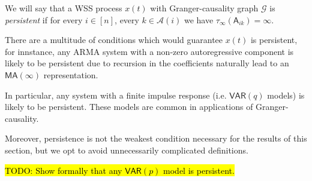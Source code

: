 \documentclass[12pt]{article}
\def\gcg{\mathcal{G}}  %
\def\VAR{\mathsf{VAR}}  %
\def\A{\mathsf{A}}  %
\newcommand{\anc}[1]{\mathcal{A}(#1)}  %
\begin{document}
\begin{definition}[Persistent]
  We will say that a WSS process $x(t)$ with Granger-causality graph
  $\gcg$ is \textit{persistent} if for every $i \in [n]$, every
  $k \in \anc{i}$ we have $\tau_\infty(\A_{ik}) = \infty$.
\end{definition}

\begin{remark}
  There are a multitude of conditions which would guarantee $x(t)$ is
  persistent, for innstance, any ARMA system with a non-zero
  autoregressive component is likely to be persistent due to recursion
  in the coefficients naturally lead to an $\mathsf{MA}(\infty)$
  representation.

  In particular, any system with a finite impulse response
  (i.e. $\mathsf{VAR}(q)$ models) is likely to be persistent.  These
  models are common in applications of Granger-causality.

  Moreover, persistence is not the weakest condition necessary for the
  results of this section, but we opt to avoid unnecessarily
  complicated definitions.
\end{remark}

\hl{TODO: Show formally that any $\VAR(p)$ model is persistent.}
\end{document}
